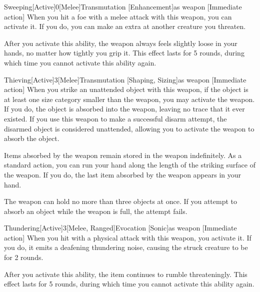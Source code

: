         \begin{magicitemdef}{Sweeping}[Active]{0}[Melee]{Transmutation [Enhancement]}{as weapon}
            [Immediate action] When you hit a foe with a melee attack with this weapon, you can activate it.
            If you do, you can make an extra  at another creature you threaten.

            After you activate this ability, the weapon always feels slightly loose in your hands, no matter how tightly you grip it.
            This effect lasts for 5 rounds, during which time you cannot activate this ability again.
        \end{magicitemdef}

        \begin{magicitemdef}{Thieving}[Active]{3}[Melee]{Transmutation [Shaping, Sizing]}{as weapon}
            [Immediate action] When you strike an unattended object with this weapon, if the object is at least one size category smaller than the weapon, you may activate the weapon.
            If you do, the object is absorbed into the weapon, leaving no trace that it ever existed.
            If you use this weapon to make a successful disarm attempt, the disarmed object is considered unattended, allowing you to activate the weapon to absorb the object.

             Items absorbed by the weapon remain stored in the weapon indefinitely.
            As a standard action, you can run your hand along the length of the striking surface of the weapon.
            If you do, the last item absorbed by the weapon appears in your hand.

            The weapon can hold no more than three objects at once.
            If you attempt to absorb an object while the weapon is full, the attempt fails.
        \end{magicitemdef}

        \begin{magicitemdef}{Thundering}[Active]{3}[Melee, Ranged]{Evocation [Sonic]}{as weapon}
            [Immediate action] When you hit with a physical attack with this weapon, you activate it.
            If you do, it emits a deafening thundering noise, causing the struck creature to be \deafened for 2 rounds.

            After you activate this ability, the item continues to rumble threateningly.
            This effect lasts for 5 rounds, during which time you cannot activate this ability again.
        \end{magicitemdef}

